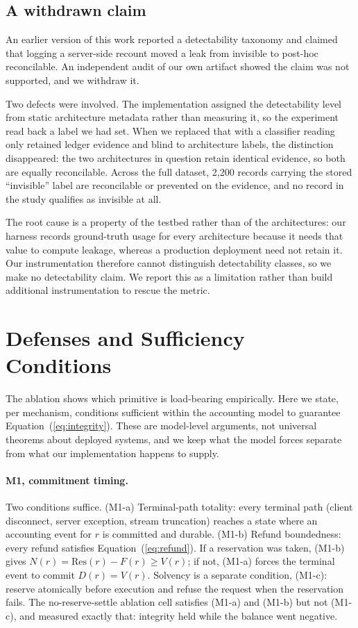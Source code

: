 \documentclass[preprint,3p,authoryear,12pt]{elsarticle}
\begin{document}
\subsection{A withdrawn claim}
\label{sec:detect}
An earlier version of this work reported a detectability taxonomy and claimed that
logging a server-side recount moved a leak from invisible to post-hoc reconcilable. An
independent audit of our own artifact showed the claim was not supported, and we
withdraw it.

Two defects were involved. The implementation assigned the detectability level from
static architecture metadata rather than measuring it, so the experiment read back a
label we had set. When we replaced that with a classifier reading only retained ledger
evidence and blind to architecture labels, the distinction disappeared: the two
architectures in question retain identical evidence, so both are equally reconcilable.
Across the full dataset, 2{,}200 records carrying the stored ``invisible'' label are
reconcilable or prevented on the evidence, and no record in the study qualifies as
invisible at all.

The root cause is a property of the testbed rather than of the architectures: our
harness records ground-truth usage for every architecture because it needs that value to
compute leakage, whereas a production deployment need not retain it. Our instrumentation
therefore cannot distinguish detectability classes, so we make no detectability claim. We
report this as a limitation rather than build additional instrumentation to rescue the
metric.

\section{Defenses and Sufficiency Conditions}
\label{sec:sufficiency}
The ablation shows which primitive is load-bearing empirically. Here we state, per
mechanism, conditions sufficient within the accounting model to guarantee
Equation~(\ref{eq:integrity}). These are model-level arguments, not universal theorems
about deployed systems, and we keep what the model forces separate from what our
implementation happens to supply.

\paragraph{M1, commitment timing.}
Two conditions suffice. (M1-a) Terminal-path totality: every terminal path (client
disconnect, server exception, stream truncation) reaches a state where an accounting
event for $r$ is committed and durable. (M1-b) Refund boundedness: every refund satisfies
Equation~(\ref{eq:refund}). If a reservation was taken, (M1-b) gives $N(r) =
\mathrm{Res}(r) - F(r) \ge V(r)$; if not, (M1-a) forces the terminal event to commit
$D(r) = V(r)$. Solvency is a separate condition, (M1-c): reserve atomically before
execution and refuse the request when the reservation fails. The no-reserve-settle
ablation cell satisfies (M1-a) and (M1-b) but not (M1-c), and measured exactly that:
integrity held while the balance went negative.
\end{document}
